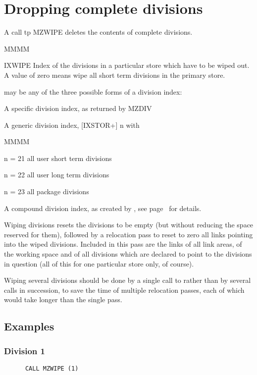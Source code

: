 \section{Dropping complete divisions}
\par A call tp MZWIPE deletes the
contents of complete divisions.
\Idesc
\begin{DL}{MMMM}
\item[IXWIPE]Index of the divisions in a particular store which have
to be wiped out.
A value of zero means wipe all short term divisions in the primary
store.
\end{DL}
\par {} may be any of the three possible forms of a division index:
\begin{OL}
\item A specific division index, as returned by MZDIV
\item A generic division index, [IXSTOR+] n with
\begin{DL}{MMMM}
\item[n = 21]all user short term divisions
\item[n = 22]all user long  term divisions
\item[n = 23]all package divisions
\end{DL}
\item A compound division index, as created by ,
see page~\pageref{SR_MZIXCO} for details.
\end{OL}
Wiping divisions resets the divisions to be empty
(but without reducing the space reserved for them),
followed by a relocation pass to reset to zero all links
pointing into the wiped divisions.
Included in this pass are the links of all link areas,
of the working space and of all divisions which are declared
to point to the divisions in question
(all of this for one particular store only, of course).
\par Wiping several divisions should be done by a single call to 
rather than by several calls in succession,
to save the time of multiple relocation passes,
each of which would take longer than the single pass.
\subsection{Examples}
\subsubsection{Division 1}
\begin{verbatim}
      CALL MZWIPE (1)
\end{verbatim}
